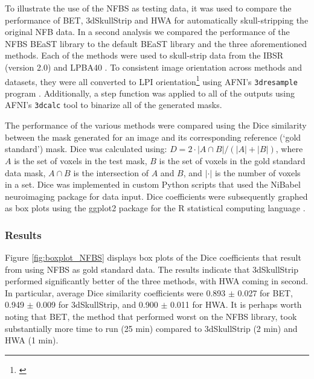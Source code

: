To illustrate the use of the NFBS as testing data, it was used to compare the performance of BET, 3dSkullStrip and HWA for automatically skull-stripping the original NFB data. In a second analysis we compared the performance of the NFBS BEaST library to the default BEaST library and the three aforementioned methods. Each of the methods were used to skull-strip data from the IBSR (version 2.0) and LPBA40 \cite{IBSR, lpba40}. To \DIFdelbegin {}\DIFdelend \DIFaddbegin {}\DIFaddend consistent image orientation across methods and datasets, they were all converted to LPI orientation\DIFaddbegin \footnote{\cite{orientation}} \DIFaddend using AFNI's \texttt{3dresample} program \cite{afni}. Additionally, a step function was applied to all of the outputs using AFNI's \texttt{3dcalc} tool to binarize all of the generated masks.

\par The performance of the various methods were compared using the Dice similarity \cite{Dice1945} between the mask generated for an image and its corresponding reference (`gold standard') mask. Dice was calculated using: $D = 2 \cdot | A \cap B | / (|A| + |B|)$, where $A$ is the set of voxels in the test mask, $B$ is the set of voxels in the gold standard data mask, $A \cap B$ is the intersection of $A$ and $B$, and $|\cdot|$ is the number of voxels in a set. Dice was implemented in custom Python scripts that used the NiBabel neuroimaging package \cite{NiBabel} for data input. Dice coefficients were subsequently graphed as box plots using the ggplot2 package \cite{Wickham2009} for the R statistical computing language \cite{R}.


\subsubsection*{Results}
Figure \ref{fig:boxplot_NFBS} displays box plots of the Dice coefficients that result from using NFBS as gold standard data. The results indicate that 3dSkullStrip performed significantly better of the three methods, with HWA coming in second. In particular, average Dice similarity coefficients were 0.893 $\pm$ 0.027 for BET, 0.949 $\pm$ 0.009 for 3dSkullStrip, and 0.900 $\pm$ 0.011 for HWA. It is perhaps worth noting that BET, the method that performed worst on the NFBS library, took substantially more time to run (25 min) compared to 3dSkullStrip (2 min) and HWA (1 min\DIFdelbegin {}\DIFdelend ).

